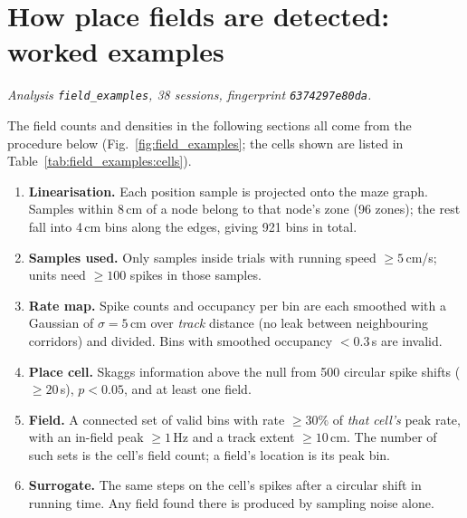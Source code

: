 \section{How place fields are detected: worked examples}
\label{sec:field_examples}
\noindent\textit{Analysis \texttt{field\_examples}, 38 sessions, fingerprint \texttt{6374297e80da}.}

The field counts and densities in the following sections all come from the procedure below (Fig.~\ref{fig:field_examples}; the cells shown are listed in Table~\ref{tab:field_examples:cells}).
\begin{enumerate}
\item \textbf{Linearisation.} Each position sample is projected onto the maze graph. Samples within 8\,cm of a node belong to that node's zone (96 zones); the rest fall into 4\,cm bins along the edges, giving 921 bins in total.
\item \textbf{Samples used.} Only samples inside trials with running speed $\geq 5$\,cm/s; units need $\geq 100$ spikes in those samples.
\item \textbf{Rate map.} Spike counts and occupancy per bin are each smoothed with a Gaussian of $\sigma = 5$\,cm over \emph{track} distance (no leak between neighbouring corridors) and divided. Bins with smoothed occupancy $< 0.3$\,s are invalid.
\item \textbf{Place cell.} Skaggs information above the null from 500 circular spike shifts ($\geq 20$\,s), $p < 0.05$, and at least one field.
\item \textbf{Field.} A connected set of valid bins with rate $\geq 30\%$ of \emph{that cell's} peak rate, with an in-field peak $\geq 1$\,Hz and a track extent $\geq 10$\,cm. The number of such sets is the cell's field count; a field's location is its peak bin.
\item \textbf{Surrogate.} The same steps on the cell's spikes after a circular shift in running time. Any field found there is produced by sampling noise alone.
\end{enumerate}

